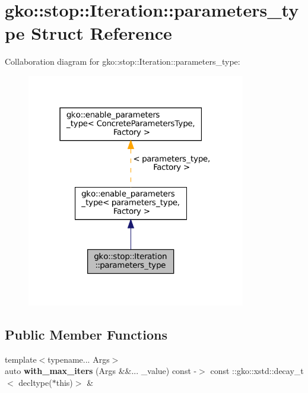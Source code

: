 \hypertarget{structgko_1_1stop_1_1Iteration_1_1parameters__type}{}\section{gko\+:\+:stop\+:\+:Iteration\+:\+:parameters\+\_\+type Struct Reference}
\label{structgko_1_1stop_1_1Iteration_1_1parameters__type}


Collaboration diagram for gko\+:\+:stop\+:\+:Iteration\+:\+:parameters\+\_\+type\+:
\nopagebreak
\begin{figure}[H]
\begin{center}
\leavevmode
\includegraphics[width=271pt]{structgko_1_1stop_1_1Iteration_1_1parameters__type__coll__graph}
\end{center}
\end{figure}
\subsection*{Public Member Functions}
\begin{DoxyCompactItemize}
\item 
\mbox{\label{structgko_1_1stop_1_1Iteration_1_1parameters__type_a5ed59b1530e06dbdf7a28269b5f63934}} 
{\footnotesize template$<$typename... Args$>$ }\\auto {\bfseries with\+\_\+max\+\_\+iters} (Args \&\&... \+\_\+value) const -\/$>$ const \+::gko\+::xstd\+::decay\+\_\+t$<$ decltype($\ast$this)$>$ \&
\end{DoxyCompactItemize}
